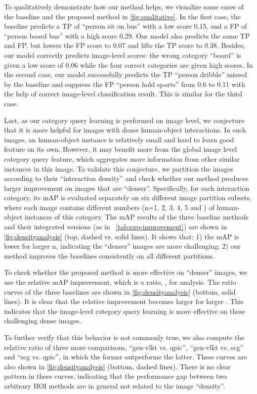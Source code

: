 \documentclass[10pt,twocolumn,letterpaper]{article}
\begin{document}
To qualitatively demonstrate how our method helps, we visualize some cases of the baseline and the proposed method in \cref{fig:qualitative}. In the first case, the baseline predicts a TP of ``person sit on bus'' with a low score 0.15, and a FP of ``person board bus'' with a high score 0.29. Our model also predicts the same TP and FP, but lowers the FP score to 0.07 and lifts the TP score to 0.38. Besides, our model correctly predicts image-level scores: the wrong category ``board'' is given a low score of 0.06 while the four correct categories are given high scores.
In the second case, our model successfully predicts the TP ``person dribble'' missed by the baseline and suppress the FP ``person hold sports'' from 0.6 to 0.11 with the help of correct image-level classification result. This is similar for the third case.


Last, as our category query learning is performed on image level, we conjecture that it is more helpful for images with dense human-object interactions. In such images, an human-object instance is relatively small and hard to learn good feature on its own. However, it may benefit more from the global image level category query feature, which aggregates more information from other similar instances in this image. To validate this conjecture, we partition the images according to their ``interaction density'' and check whether our method produces larger improvement on images that are ``denser''. Specifically, for each interaction category, its mAP is evaluated separately on six different image partition subsets, where each image contains different numbers (n=1, 2, 3, 4, 5 and ) of human-object instances of this category. The mAP results of the three baseline methods and their integrated versions (as in ~\cref{tab:exp-improvement}) are shown in \cref{fig:densityanalysis} (top, dashed vs. solid lines). It shows that: 1) the mAP is lower for larger n, indicating the ``denser'' images are more challenging; 2) our method improves the baselines consistently on all different partitions.

To check whether the proposed method is more effective on ``denser'' images, we use the relative mAP improvement, which is a ratio, , for analysis. The ratio curves of the three baselines are shown in \cref{fig:densityanalysis} (bottom, solid lines). It is clear that the relative improvement becomes larger for larger . This indicates that the image-level category query learning is more effective on these challenging dense images.

To further verify that this behavior is not commonly true, we also compute the relative ratio of three more comparisons, ``gen-vlkt vs. qpic'', ``gen-vlkt vs. scg'' and ``scg vs. qpic'', in which the former outperforms the latter. These curves are also shown in \cref{fig:densityanalysis} (bottom, dashed lines). There is no clear pattern in these curves, indicating that the performance gap between two arbitrary HOI methods are in general not related to the image ``density''.
\end{document}
